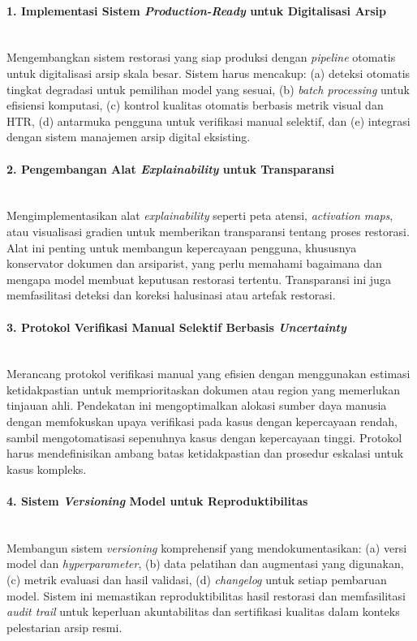 \documentclass[12pt,a4paper]{article}
\begin{document}
\paragraph{1. Implementasi Sistem \textit{Production-Ready} untuk Digitalisasi Arsip} \mbox{}\\[0.1em]
Mengembangkan sistem restorasi yang siap produksi dengan \textit{pipeline} otomatis untuk digitalisasi arsip skala besar. Sistem harus mencakup: (a) deteksi otomatis tingkat degradasi untuk pemilihan model yang sesuai, (b) \textit{batch processing} untuk efisiensi komputasi, (c) kontrol kualitas otomatis berbasis metrik visual dan HTR, (d) antarmuka pengguna untuk verifikasi manual selektif, dan (e) integrasi dengan sistem manajemen arsip digital eksisting.

\paragraph{2. Pengembangan Alat \textit{Explainability} untuk Transparansi} \mbox{}\\[0.1em]
Mengimplementasikan alat \textit{explainability} seperti peta atensi, \textit{activation maps}, atau visualisasi gradien untuk memberikan transparansi tentang proses restorasi. Alat ini penting untuk membangun kepercayaan pengguna, khususnya konservator dokumen dan arsiparist, yang perlu memahami bagaimana dan mengapa model membuat keputusan restorasi tertentu. Transparansi ini juga memfasilitasi deteksi dan koreksi halusinasi atau artefak restorasi.

\paragraph{3. Protokol Verifikasi Manual Selektif Berbasis \textit{Uncertainty}} \mbox{}\\[0.1em]
Merancang protokol verifikasi manual yang efisien dengan menggunakan estimasi ketidakpastian untuk memprioritaskan dokumen atau region yang memerlukan tinjauan ahli. Pendekatan ini mengoptimalkan alokasi sumber daya manusia dengan memfokuskan upaya verifikasi pada kasus dengan kepercayaan rendah, sambil mengotomatisasi sepenuhnya kasus dengan kepercayaan tinggi. Protokol harus mendefinisikan ambang batas ketidakpastian dan prosedur eskalasi untuk kasus kompleks.

\paragraph{4. Sistem \textit{Versioning} Model untuk Reproduktibilitas} \mbox{}\\[0.1em]
Membangun sistem \textit{versioning} komprehensif yang mendokumentasikan: (a) versi model dan \textit{hyperparameter}, (b) data pelatihan dan augmentasi yang digunakan, (c) metrik evaluasi dan hasil validasi, (d) \textit{changelog} untuk setiap pembaruan model. Sistem ini memastikan reproduktibilitas hasil restorasi dan memfasilitasi \textit{audit trail} untuk keperluan akuntabilitas dan sertifikasi kualitas dalam konteks pelestarian arsip resmi.
\end{document}
